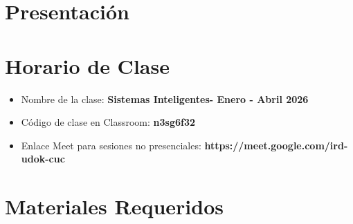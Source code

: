 \documentclass[aspectratio=169]{beamer}
\title[\abreviaturaNombreMateria]{\nombreMateria} %
\author{Dr. Marco Aurelio Nuño Maganda} %
\institute[UPV] %
{
Universidad Politecnica de Victoria \\ %
Ingenieria en Tecnologias de la Informacion \\ %
Cuatrimestre \cuatrimestre  \\ %
\medskip
\textit{mnunom@upv.edu.mx} %
}
\date{\today} %
\newcommand{\nombreMateria}{Sistemas Inteligentes}
\newcommand{\cuatrimestre}{Enero - Abril 2026}
\newcommand{\claveClassroom}{n3sg6f32}
\newcommand{\claveMeet}{https://meet.google.com/ird-udok-cuc}
\begin{document}
\begin{frame}
\titlepage %
\end{frame}




\section{Presentación} 



\section{Horario de Clase}






\begin{frame}
\begin{itemize}
\frametitle{Plataforma Virtual para el Curso}
\item Nombre de la clase: \textbf{\nombreMateria - \cuatrimestre}
\item Código de clase en Classroom: \textbf{\claveClassroom}
\item Enlace Meet para sesiones no presenciales: \textbf{\claveMeet}
\end{itemize}

\end{frame}
















\section{Materiales Requeridos}

\end{document}

